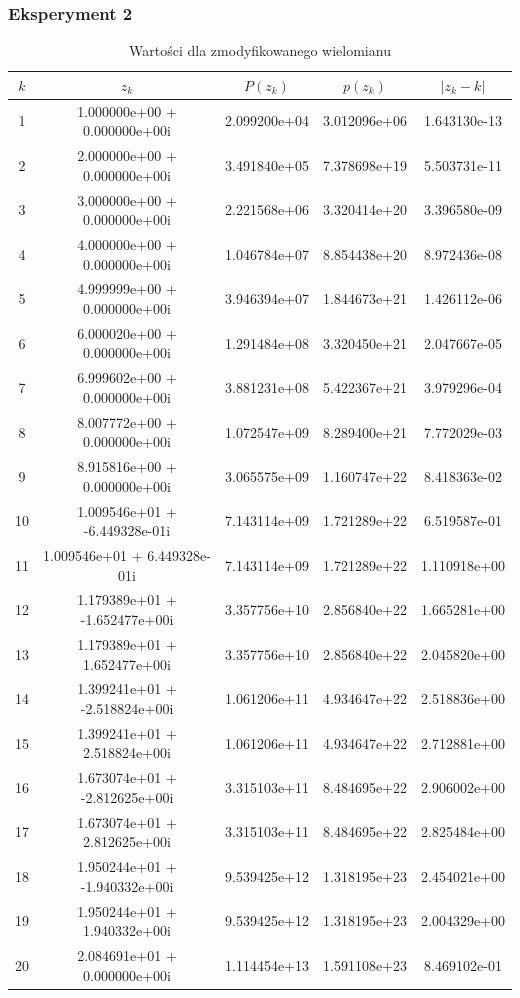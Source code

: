 \documentclass[12pt]{article}
\begin{document}
\newpage
\subsubsection*{Eksperyment 2}

\begin{table}[!hbt]
\centering
\footnotesize
    \label{tab:table5}
    \begin{tabular}{|c|c|c|c|c|}
    		\hline
    		$k$ & $z_k$ & $P(z_k)$ & $p(z_k)$ & $|z_k - k|$\\
		\hline
1 & 1.000000e+00 + 0.000000e+00i & 2.099200e+04 & 3.012096e+06 & 1.643130e-13\\
\hline
2 & 2.000000e+00 + 0.000000e+00i & 3.491840e+05 & 7.378698e+19 & 5.503731e-11\\
\hline
3 & 3.000000e+00 + 0.000000e+00i & 2.221568e+06 & 3.320414e+20 & 3.396580e-09\\
\hline
4 & 4.000000e+00 + 0.000000e+00i & 1.046784e+07 & 8.854438e+20 & 8.972436e-08\\
\hline
5 & 4.999999e+00 + 0.000000e+00i & 3.946394e+07 & 1.844673e+21 & 1.426112e-06\\
\hline
6 & 6.000020e+00 + 0.000000e+00i & 1.291484e+08 & 3.320450e+21 & 2.047667e-05\\
\hline
7 & 6.999602e+00 + 0.000000e+00i & 3.881231e+08 & 5.422367e+21 & 3.979296e-04\\
\hline
8 & 8.007772e+00 + 0.000000e+00i & 1.072547e+09 & 8.289400e+21 & 7.772029e-03\\
\hline
9 & 8.915816e+00 + 0.000000e+00i & 3.065575e+09 & 1.160747e+22 & 8.418363e-02\\
\hline
10 & 1.009546e+01 + -6.449328e-01i & 7.143114e+09 & 1.721289e+22 & 6.519587e-01\\
\hline
11 & 1.009546e+01 + 6.449328e-01i & 7.143114e+09 & 1.721289e+22 & 1.110918e+00\\
\hline
12 & 1.179389e+01 + -1.652477e+00i & 3.357756e+10 & 2.856840e+22 & 1.665281e+00\\
\hline
13 & 1.179389e+01 + 1.652477e+00i & 3.357756e+10 & 2.856840e+22 & 2.045820e+00\\
\hline
14 & 1.399241e+01 + -2.518824e+00i & 1.061206e+11 & 4.934647e+22 & 2.518836e+00\\
\hline
15 & 1.399241e+01 + 2.518824e+00i & 1.061206e+11 & 4.934647e+22 & 2.712881e+00\\
\hline
16 & 1.673074e+01 + -2.812625e+00i & 3.315103e+11 & 8.484695e+22 & 2.906002e+00\\
\hline
17 & 1.673074e+01 + 2.812625e+00i & 3.315103e+11 & 8.484695e+22 & 2.825484e+00\\
\hline
18 & 1.950244e+01 + -1.940332e+00i & 9.539425e+12 & 1.318195e+23 & 2.454021e+00\\
\hline
19 & 1.950244e+01 + 1.940332e+00i & 9.539425e+12 & 1.318195e+23 & 2.004329e+00\\
\hline
20 & 2.084691e+01 + 0.000000e+00i & 1.114454e+13 & 1.591108e+23 & 8.469102e-01\\
\hline
    \end{tabular}
    \caption{Wartości dla zmodyfikowanego wielomianu}
\end{table}
\end{document}
